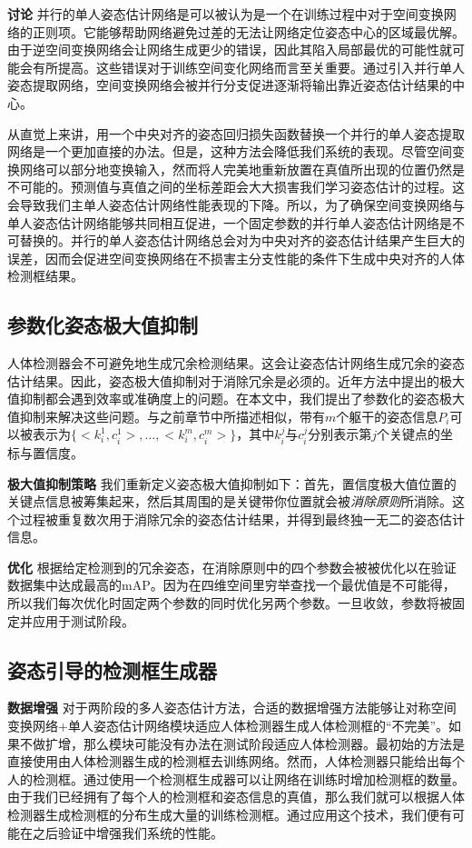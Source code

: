 \textbf{讨论} 并行的单人姿态估计网络是可以被认为是一个在训练过程中对于空间变换网络的正则项。它能够帮助网络避免过差的无法让网络定位姿态中心的区域最优解。由于逆空间变换网络会让网络生成更少的错误，因此其陷入局部最优的可能性就可能会有所提高。这些错误对于训练空间变化网络而言至关重要。通过引入并行单人姿态提取网络，空间变换网络会被并行分支促进逐渐将输出靠近姿态估计结果的中心。

从直觉上来讲，用一个中央对齐的姿态回归损失函数替换一个并行的单人姿态提取网络是一个更加直接的办法。但是，这种方法会降低我们系统的表现。尽管空间变换网络可以部分地变换输入，然而将人完美地重新放置在真值所出现的位置仍然是不可能的。预测值与真值之间的坐标差距会大大损害我们学习姿态估计的过程。这会导致我们主单人姿态估计网络性能表现的下降。所以，为了确保空间变换网络与单人姿态估计网络能够共同相互促进，一个固定参数的并行单人姿态估计网络是不可替换的。并行的单人姿态估计网络总会对为中央对齐的姿态估计结果产生巨大的误差，因而会促进空间变换网络在不损害主分支性能的条件下生成中央对齐的人体检测框结果。

\subsection{参数化姿态极大值抑制}
人体检测器会不可避免地生成冗余检测结果。这会让姿态估计网络生成冗余的姿态估计结果。因此，姿态极大值抑制对于消除冗余是必须的。近年方法中提出的极大值抑制都会遇到效率或准确度上的问题。在本文中，我们提出了参数化的姿态极大值抑制来解决这些问题。与之前章节中所描述相似，带有$m$个躯干的姿态信息$P_i$可以被表示为$\{<k_i^1, c_i^1>, ...,<k_i^m, c_i^m>\}$，其中$k_i^j$与$c_i^j$分别表示第$j$个关键点的坐标与置信度。

\textbf{极大值抑制策略} 我们重新定义姿态极大值抑制如下：首先，置信度极大值位置的关键点信息被筹集起来，然后其周围的是关键带你位置就会被\textit{消除原则}所消除。这个过程被重复数次用于消除冗余的姿态估计结果，并得到最终独一无二的姿态估计信息。

\textbf{优化} 根据给定检测到的冗余姿态，在消除原则中的四个参数会被被优化以在验证数据集中达成最高的mAP。因为在四维空间里穷举查找一个最优值是不可能得，所以我们每次优化时固定两个参数的同时优化另两个参数。一旦收敛，参数将被固定并应用于测试阶段。

\subsection{姿态引导的检测框生成器}
\textbf{数据增强} 对于两阶段的多人姿态估计方法，合适的数据增强方法能够让对称空间变换网络+单人姿态估计网络模块适应人体检测器生成人体检测框的“不完美”。如果不做扩增，那么模块可能没有办法在测试阶段适应人体检测器。最初始的方法是直接使用由人体检测器生成的检测框去训练网络。然而，人体检测器只能给出每个人的检测框。通过使用一个检测框生成器可以让网络在训练时增加检测框的数量。由于我们已经拥有了每个人的检测框和姿态信息的真值，那么我们就可以根据人体检测器生成检测框的分布生成大量的训练检测框。通过应用这个技术，我们便有可能在之后验证中增强我们系统的性能。

